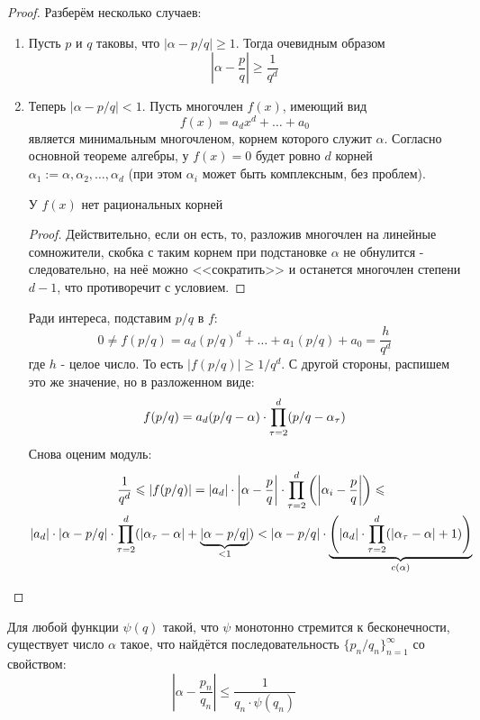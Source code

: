 \begin{proof}
	Разберём несколько случаев:
	\begin{enumerate}
		\item Пусть $p$ и $q$ таковы, что $|\alpha - p/q| \ge 1$. Тогда очевидным образом
		\[
			\left|\alpha - \frac{p}{q}\right| \ge \frac{1}{q^d}
		\]
		
		\item Теперь $|\alpha - p/q| < 1$. Пусть многочлен $f(x)$, имеющий вид
		\[
			f(x) = a_d x^d + \ldots + a_0
		\]
		является минимальным многочленом, корнем которого служит $\alpha$. Согласно основной теореме алгебры, у $f(x) = 0$ будет ровно $d$ корней $\alpha_1 := \alpha, \alpha_2, \ldots, \alpha_d$ (при этом $\alpha_i$ может быть комплексным, без проблем).
		\begin{proposition}
			У $f(x)$ нет рациональных корней
		\end{proposition}
		
		\begin{proof}
			Действительно, если он есть, то, разложив многочлен на линейные сомножители, скобка с таким корнем при подстановке $\alpha$ не обнулится - следовательно, на неё можно <<сократить>> и останется многочлен степени $d - 1$, что противоречит с условием.
		\end{proof}
	
		Ради интереса, подставим $p/q$ в $f$:
		\[
			0 \neq f(p/q) = a_d (p/q)^d + \ldots + a_1 (p/q) + a_0 = \frac{h}{q^d}
		\]
		где $h$ - целое число. То есть $|f(p/q)| \ge 1/q^d$. С другой стороны, распишем это же значение, но в разложенном виде:
		\[
			f(p/q) = a_d (p/q - \alpha) \cdot \prod\limits_{\tau = 2}^d (p/q - \alpha_\tau)
		\]
		Снова оценим модуль:
		\begin{multline*}
			\frac{1}{q^d} \leqslant |f(p/q)| = |a_d| \cdot \left|\alpha - \frac{p}{q}\right| \cdot \prod\limits_{\tau = 2}^d \left(\left|\alpha_i - \frac{p}{q}\right|\right) \leqslant
			\\
			|a_d| \cdot |\alpha - p/q| \cdot \prod\limits_{\tau = 2}^d (|\alpha_\tau - \alpha| + \underbrace{|\alpha - p/q|}_{< 1}) < |\alpha - p/q| \cdot \underbrace{\left(|a_d| \cdot \prod\limits_{\tau = 2}^d (|\alpha_\tau - \alpha| + 1)\right)}_{c(\alpha)}
		\end{multline*}
	\end{enumerate}
\end{proof}

\begin{theorem}
	Для любой функции $\psi(q)$ такой, что $\psi$ монотонно стремится к бесконечности, существует число $\alpha$ такое, что найдётся последовательность $\{p_n/q_n\}_{n = 1}^\infty$ со свойством:
	\[
		\left|\alpha -  \frac{p_n}{q_n}\right| \le \frac{1}{q_n \cdot \psi(q_n)}
	\]
\end{theorem}

